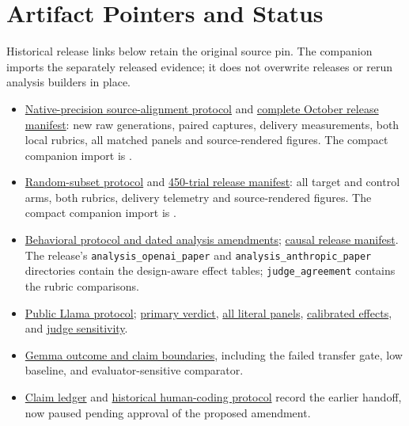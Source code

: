 \documentclass[11pt]{article}
\newcommand{\artifact}[2]{\href{https://github.com/tdj28/llm_selfref_pre/blob/f5e906e1737bc71bf20b642af1d698018eec82fe/#1}{#2}}
\newcommand{\nativeartifact}[2]{\href{https://github.com/tdj28/llm_selfref_pre/blob/ef10a0349e047272212319dadf484c3281e60bbe/#1}{#2}}
\newcommand{\ensembleartifact}[2]{\href{https://github.com/tdj28/llm_selfref_pre/blob/dd1c350cf6c2e3224a201b4e4aab943376c43b62/#1}{#2}}
\begin{document}
\section{Artifact Pointers and Status}\label{app:provenance}

Historical release links below retain the original source pin. The companion
imports the separately released evidence; it does not overwrite releases or
rerun analysis builders in place.
\begin{itemize}
\item \nativeartifact{docs/BERG_SOURCE_REPLICATION_PROTOCOL_20260930.md}{Native-precision source-alignment protocol}
and \nativeartifact{data/berg_source_replication/source_aligned_v1_20261001/RELEASE_MANIFEST.json}{complete October release manifest}:
new raw generations, paired captures, delivery measurements, both local
rubrics, all matched panels and source-rendered figures. The compact
companion import is .
\item \ensembleartifact{docs/BERG_ENSEMBLE_PROTOCOL_20261001.md}{Random-subset protocol}
and \ensembleartifact{data/berg_ensemble_replication/random_subset_v1_20261001/RELEASE_MANIFEST.json}{450-trial release manifest}:
all target and control arms, both rubrics, delivery telemetry and source-rendered
figures. The compact companion import is
.
\item \artifact{docs/CONFIRMATORY_PROTOCOL.md}{Behavioral protocol and dated
analysis amendments}; \artifact{data/causal_transplant/confirmatory_v1_20260709/manifest.json}{causal release manifest}.
The release's \texttt{analysis\_openai\_paper} and
\texttt{analysis\_anthropic\_paper} directories contain the design-aware
effect tables; \texttt{judge\_agreement} contains the rubric comparisons.
\item \artifact{docs/SAE_CONSCIOUSNESS_GATING_PROTOCOL.md}{Public Llama
protocol}; \artifact{data/public_sae_consciousness_gating/confirmatory_v1_20260710/analysis/primary_verdict.json}{primary verdict},
\artifact{data/public_sae_consciousness_gating/confirmatory_v1_20260710/analysis/aggregate_effects.csv}{all literal panels},
\artifact{data/public_sae_consciousness_gating/confirmatory_v1_20260710/analysis/calibrated_aggregate_effects.csv}{calibrated effects}, and
\artifact{data/public_sae_consciousness_gating/confirmatory_v1_20260710/analysis/judge_sensitivity.csv}{judge sensitivity}.
\item \artifact{docs/GEMMA_SCOPE_9B_RESULTS.md}{Gemma outcome and claim
boundaries}, including the failed transfer gate, low baseline, and
evaluator-sensitive comparator.
\item \artifact{docs/CLAIM_LEDGER.md}{Claim ledger} and
\artifact{docs/HUMAN_CODING_HANDOFF.md}{historical human-coding protocol} record
the earlier handoff, now paused pending approval of the proposed amendment.
\end{itemize}
\end{document}
